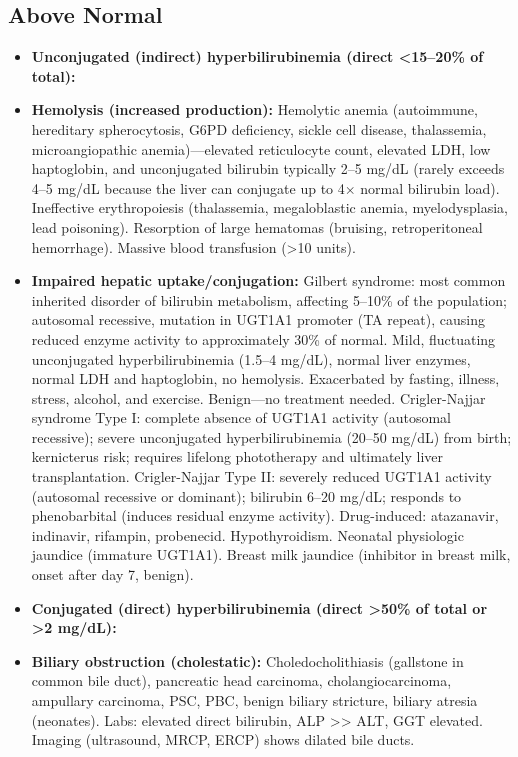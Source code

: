 \subsection*{Above Normal}
\begin{itemize}
  \item \textbf{Unconjugated (indirect) hyperbilirubinemia (direct <15--20\% of total):}
  \item \textbf{Hemolysis (increased production):} Hemolytic anemia (autoimmune, hereditary spherocytosis, G6PD deficiency, sickle cell disease, thalassemia, microangiopathic anemia)---elevated reticulocyte count, elevated LDH, low haptoglobin, and unconjugated bilirubin typically 2--5 mg/dL (rarely exceeds 4--5 mg/dL because the liver can conjugate up to 4$\times$ normal bilirubin load). Ineffective erythropoiesis (thalassemia, megaloblastic anemia, myelodysplasia, lead poisoning). Resorption of large hematomas (bruising, retroperitoneal hemorrhage). Massive blood transfusion (>10 units).
  \item \textbf{Impaired hepatic uptake/conjugation:} Gilbert syndrome: most common inherited disorder of bilirubin metabolism, affecting 5--10\% of the population; autosomal recessive, mutation in UGT1A1 promoter (TA repeat), causing reduced enzyme activity to approximately 30\% of normal. Mild, fluctuating unconjugated hyperbilirubinemia (1.5--4 mg/dL), normal liver enzymes, normal LDH and haptoglobin, no hemolysis. Exacerbated by fasting, illness, stress, alcohol, and exercise. Benign---no treatment needed. Crigler-Najjar syndrome Type I: complete absence of UGT1A1 activity (autosomal recessive); severe unconjugated hyperbilirubinemia (20--50 mg/dL) from birth; kernicterus risk; requires lifelong phototherapy and ultimately liver transplantation. Crigler-Najjar Type II: severely reduced UGT1A1 activity (autosomal recessive or dominant); bilirubin 6--20 mg/dL; responds to phenobarbital (induces residual enzyme activity). Drug-induced: atazanavir, indinavir, rifampin, probenecid. Hypothyroidism. Neonatal physiologic jaundice (immature UGT1A1). Breast milk jaundice (inhibitor in breast milk, onset after day 7, benign).
  \item \textbf{Conjugated (direct) hyperbilirubinemia (direct >50\% of total or >2 mg/dL):}
  \item \textbf{Biliary obstruction (cholestatic):} Choledocholithiasis (gallstone in common bile duct), pancreatic head carcinoma, cholangiocarcinoma, ampullary carcinoma, PSC, PBC, benign biliary stricture, biliary atresia (neonates). Labs: elevated direct bilirubin, ALP >> ALT, GGT elevated. Imaging (ultrasound, MRCP, ERCP) shows dilated bile ducts.

\end{itemize}
